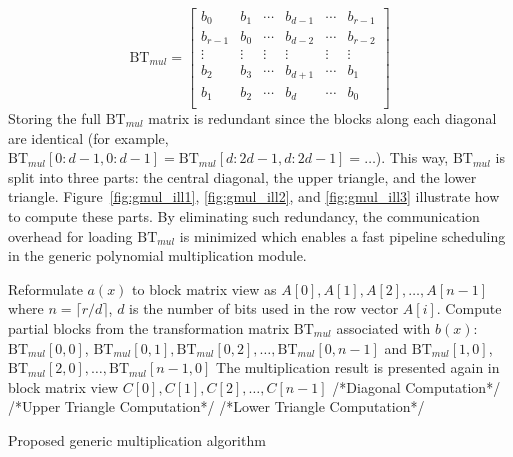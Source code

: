 \documentclass[runningheads]{llncs}
\begin{document}
\[
\text{BT}_{mul} =
\left[ \begin{array}{cccccc}
b_{0}&b_{1}&\cdots&b_{d-1}&\cdots &b_{r-1} \\
b_{r-1}&b_{0}&\cdots&b_{d-2}&\cdots &b_{r-2} \\
\vdots&\vdots&\vdots&\vdots&\vdots&\vdots\\
b_{2}&b_{3}&\cdots&b_{d+1}&\cdots &b_{1} \\
b_{1}&b_{2}&\cdots&b_{d}&\cdots &b_{0} \\
\end{array}
\right ]
\]
Storing the full $\text{BT}_{mul}$ matrix is redundant 
since the blocks along each diagonal are identical 
(for example, $\text{BT}_{mul}[0:d-1,0:d-1] = \text{BT}_{mul}[d:2d-1,d:2d-1] = \ldots$). 
This way, $\text{BT}_{mul}$ is split into three parts: the central diagonal, the upper triangle, and the lower triangle. Figure~\ref{fig:gmul_ill1}, \ref{fig:gmul_ill2}, and \ref{fig:gmul_ill3} illustrate how to compute these parts. 
By eliminating such redundancy, the communication overhead for 
loading $\text{BT}_{mul}$ is minimized which enables a 
fast pipeline scheduling in the generic polynomial multiplication module.

\begin{algorithm}[!tbh]
 \DontPrintSemicolon %
    Reformulate $a(x)$ to block matrix view as $A[0],A[1],A[2],\ldots, A[n-1]$ where $n=\lceil r/d \rceil$, $d$ is the number of bits used in the row vector $A[i]$.\;
    Compute partial blocks from the transformation matrix $\text{BT}_{mul}$ associated with $b(x)$: $\text{BT}_{mul}[0,0]$, $\text{BT}_{mul}[0,1],\text{BT}_{mul}[0,2],\ldots,\text{BT}_{mul}[0,n-1]$ and $\text{BT}_{mul}[1,0]$, $\text{BT}_{mul}[2,0],\ldots,\text{BT}_{mul}[n-1,0]$\;
    The multiplication result is presented again in block matrix view $C[0],C[1],C[2],\ldots, C[n-1]$\;
    /*Diagonal Computation*/\;
    /*Upper Triangle Computation*/\;
    /*Lower Triangle Computation*/\;
 \caption{Proposed generic multiplication algorithm}\label{alg:generic_mul}
\end{algorithm}
\end{document}
